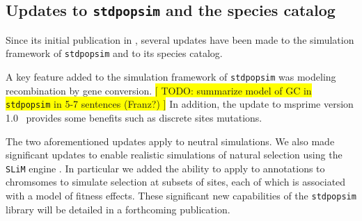 \documentclass[hidelinks]{article}
\newcommand{\stdpopsim}{\texttt{stdpopsim}\xspace}
\begin{document}
\hypertarget{sec3}{%
	\subsection*{Updates to \stdpopsim and the species catalog}\label{sec:expanded-catalog}}

Since its initial publication in \cite{Adrion2020}, several updates have been made
to  the simulation framework of \stdpopsim and to its species catalog.

A key feature added to the simulation framework of \stdpopsim
was modeling recombination by gene conversion. %
\colorbox{yellow}{[ TODO: summarize model of GC in \stdpopsim in 5-7 sentences (Franz?) ]}
In addition, the update to msprime version 1.0~\citep{Baumdicker2022}
provides some benefits such as discrete sites mutations.


The two aforementioned updates apply to neutral simulations.
We also made significant updates to enable realistic simulations of natural selection
using the \texttt{SLiM} engine \citep{Haller2019}. In particular we added the ability to
apply to annotations to chromsomes to simulate selection at subsets of sites,
each of which is associated with a model of fitness effects.
These significant new capabilities of the \stdpopsim library will be detailed in a forthcoming publication.
\end{document}
